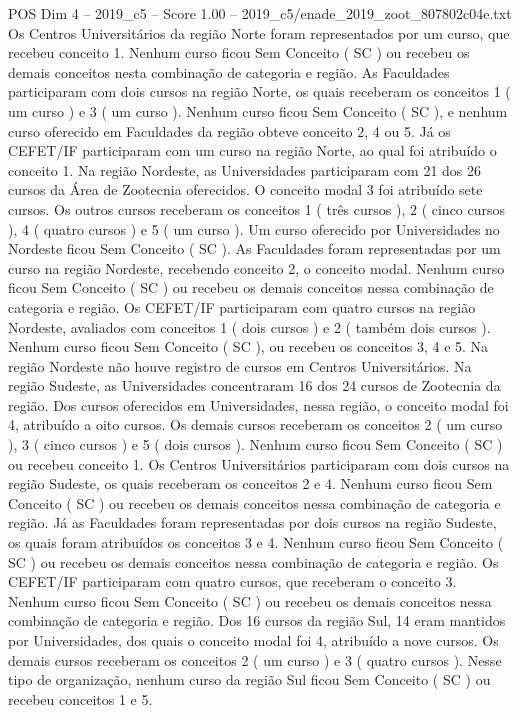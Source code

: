 \begin{textsample}{POS Dim 4 – 2019\_c5 – Score 1.00 – 2019\_c5/enade\_2019\_zoot\_807802c04e.txt}
Os Centros Universitários da região Norte foram representados por um curso, que recebeu conceito 1.
Nenhum curso ficou Sem Conceito ( SC ) ou recebeu os demais conceitos nesta combinação de categoria e região.
As Faculdades participaram com dois cursos na região Norte, os quais receberam os conceitos 1 ( um curso ) e 3 ( um curso ).
Nenhum curso ficou Sem Conceito ( SC ), e nenhum curso oferecido em Faculdades da região obteve conceito 2, 4 ou 5.
Já os CEFET/IF participaram com um curso na região Norte, ao qual foi atribuído o conceito 1.
Na região Nordeste, as Universidades participaram com 21 dos 26 cursos da Área de Zootecnia oferecidos.
O conceito modal 3 foi atribuído sete cursos.
Os outros cursos receberam os conceitos 1 ( três cursos ), 2 ( cinco cursos ), 4 ( quatro cursos ) e 5 ( um curso ).
Um curso oferecido por Universidades no Nordeste ficou Sem Conceito ( SC ).
As Faculdades foram representadas por um curso na região Nordeste, recebendo conceito 2, o conceito modal.
Nenhum curso ficou Sem Conceito ( SC ) ou recebeu os demais conceitos nessa combinação de categoria e região.
Os CEFET/IF participaram com quatro cursos na região Nordeste, avaliados com conceitos 1 ( dois cursos ) e 2 ( também dois cursos ).
Nenhum curso ficou Sem Conceito ( SC ), ou recebeu os conceitos 3, 4 e 5.
Na região Nordeste não houve registro de cursos em Centros Universitários.
Na região Sudeste, as Universidades concentraram 16 dos 24 cursos de Zootecnia da região.
Dos cursos oferecidos em Universidades, nessa região, o conceito modal foi 4, atribuído a oito cursos.
Os demais cursos receberam os conceitos 2 ( um curso ), 3 ( cinco cursos ) e 5 ( dois cursos ).
Nenhum curso ficou Sem Conceito ( SC ) ou recebeu conceito 1.
Os Centros Universitários participaram com dois cursos na região Sudeste, os quais receberam os conceitos 2 e 4.
Nenhum curso ficou Sem Conceito ( SC ) ou recebeu os demais conceitos nessa combinação de categoria e região.
Já as Faculdades foram representadas por dois cursos na região Sudeste, os quais foram atribuídos os conceitos 3 e 4.
Nenhum curso ficou Sem Conceito ( SC ) ou recebeu os demais conceitos nessa combinação de categoria e região.
Os CEFET/IF participaram com quatro cursos, que receberam o conceito 3.
Nenhum curso ficou Sem Conceito ( SC ) ou recebeu os demais conceitos nessa combinação de categoria e região.
Dos 16 cursos da região Sul, 14 eram mantidos por Universidades, dos quais o conceito modal foi 4, atribuído a nove cursos.
Os demais cursos receberam os conceitos 2 ( um curso ) e 3 ( quatro cursos ).
Nesse tipo de organização, nenhum curso da região Sul ficou Sem Conceito ( SC ) ou recebeu conceitos 1 e 5.

\end{textsample}
